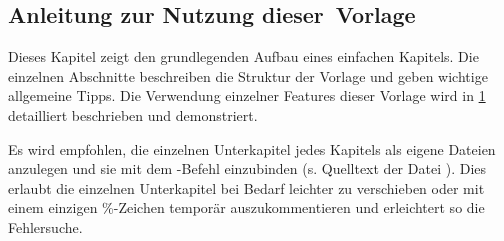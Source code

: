 %
\begin{showExamples}%
%
\chapter{Anleitung zur Nutzung \mbox{dieser Vorlage}}%
\label{chap:Examples}
%
%
Dieses Kapitel zeigt den grundlegenden Aufbau eines einfachen Kapitels.
Die einzelnen Abschnitte beschreiben die Struktur der Vorlage und geben wichtige allgemeine Tipps.
Die Verwendung einzelner Features dieser Vorlage wird in \cref{chap:Examples} detailliert beschrieben und demonstriert.

Es wird empfohlen, die einzelnen Unterkapitel jedes Kapitels 
als eigene Dateien anzulegen und sie mit dem \verb++-Befehl einzubinden
(s. Quelltext der Datei ).
Dies erlaubt die einzelnen Unterkapitel bei Bedarf leichter zu verschieben 
oder mit einem einzigen \%-Zeichen temporär auszukommentieren 
und erleichtert so die Fehlersuche.


\end{showExamples}
